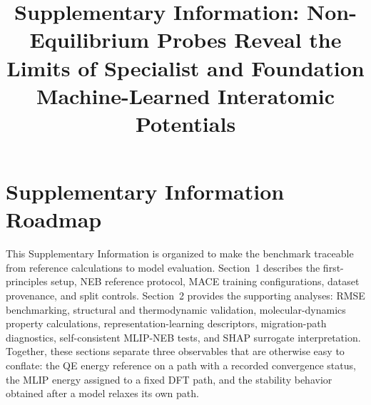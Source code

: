 \documentclass[pdflatex,sn-mathphys-num]{sn-jnl}%
\theoremstyle{thmstyleone}%
\theoremstyle{thmstyletwo}%
\theoremstyle{thmstylethree}%
\begin{document}
\linenumbers

\title[Article Title]{Supplementary Information: Non-Equilibrium Probes Reveal the Limits of Specialist and Foundation Machine-Learned Interatomic Potentials}


\author[1]{ }

\author[1]{ }

\author*[1]{ }





\maketitle

\section*{Supplementary Information Roadmap}
This Supplementary Information is organized to make the benchmark traceable from reference calculations to model evaluation. Section~1 describes the first-principles setup, NEB reference protocol, MACE training configurations, dataset provenance, and split controls. Section~2 provides the supporting analyses: RMSE benchmarking, structural and thermodynamic validation, molecular-dynamics property calculations, representation-learning descriptors, migration-path diagnostics, self-consistent MLIP-NEB tests, and SHAP surrogate interpretation. Together, these sections separate three observables that are otherwise easy to conflate: the QE energy reference on a path with a recorded convergence status, the MLIP energy assigned to a fixed DFT path, and the stability behavior obtained after a model relaxes its own path.
\end{document}
